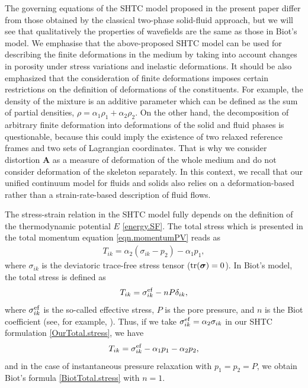 \documentclass[3p,times,table]{article}
\renewcommand{\AA}{{\bm{A}}}
\newcommand{\tr}{\textnormal{tr}}
\begin{document}
The governing equations of the SHTC model proposed in the present paper differ from 
those obtained by the classical two-phase solid-fluid approach, but we will see 
that qualitatively the properties of wavefields are the same as those in 
Biot's model.
We emphasise that the above-proposed SHTC model can be used for describing the finite deformations in the medium by taking into account changes in porosity under stress variations and inelastic deformations. 
It should be also emphasized that the consideration of finite deformations 
imposes certain restrictions on the definition of deformations of the constituents. 
For example, the density of the mixture is an additive parameter which can be 
defined as the sum of partial densities, $ \rho=\alpha_1 \rho_1 + \alpha_2 
\rho_2$. On the other hand, the decomposition of arbitrary finite deformation 
into 
deformations of the solid and fluid phases is questionable, because this could 
imply the existence of two relaxed reference frames and two sets of Lagrangian 
coordinates. That is why we consider distortion $\AA$ as a measure of 
deformation of the whole medium and do not consider deformation of the skeleton 
separately. In this context, we recall that our unified continuum model 
for fluids and solids \cite{HPR2016,DPRZ2016,HYP2016} also relies on a 
deformation-based rather than a strain-rate-based description of fluid flows.

The stress-strain relation in the SHTC model fully depends on the definition of 
the thermodynamic potential $ E $ \eqref{energy.SF}. The total stress which is 
presented in the total momentum equation \eqref{eqn.momentumPV} reads as 
\begin{align}\label{OurTotal.stress}
T_{ik}=\alpha_2 (\sigma_{ik}-p_2)-\alpha_1 p_1,
\end{align}
where $\sigma_{ik}$ is the deviatoric trace-free stress tensor ($\tr 
(\bm{\sigma})=0$). 
In Biot's model, the total stress is defined as 
\begin{align}\label{BiotTotal.stress}
T_{ik}=\sigma^{\rm ef}_{ik}-n P\delta_{ik},
\end{align}
where $\sigma^{\rm ef}_{ik}$ is the so-called effective stress, $P$ is the pore 
pressure, and $n$ is the Biot coefficient (see, for example, 
\cite{Merxhani2016}). 
Thus, if we take $\sigma^{\rm ef}_{ik}=\alpha_2\sigma_{ik}$ in our SHTC 
formulation \eqref{OurTotal.stress}, we have
\begin{equation}
T_{ik}=\sigma^{\rm ef}_{ik}-\alpha_1 p_1- \alpha_2 p_2,
\end{equation}
and in the case of instantaneous pressure relaxation with $p_1=p_2=P$, we 
obtain Biot's formula \eqref{BiotTotal.stress} with 
$n=1$.
\end{document}
